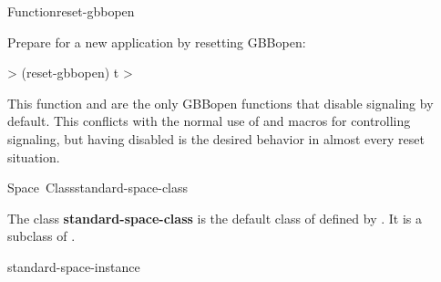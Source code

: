 \documentclass[10pt,twoside,english,pdftex]{article}
\begin{document}
\begin{functiondoc}{Function}{reset-gbbopen}
\fnexample

Prepare for a new application by resetting GBBopen:
%
\W\supp
\begin{example}
  > (reset-gbbopen)
  t
  >
\end{example}

\fnnote 
{}%
%
This function and \textbf{} are the only
GBBopen functions that disable  signaling by default.  This
conflicts with the normal use of \textbf{}
and \textbf{} macros for controlling
 signaling, but having  disabled is the desired
behavior in almost every reset situation.

\end{functiondoc}


\begin{functiondoc}{Space~Class}{standard-space-class}{}
%
%
%
  
\fnsyntax

\fnpackage {}

\fnmodule {}

\fndescription 
{}%
%
The class \textbf{standard-space-class} is the default class of
 defined by \textbf{}.
It is a subclass of \textbf{}.

\begin{alsos}{standard-space-instance}
\end{alsos}

\end{functiondoc}

\end{document}
